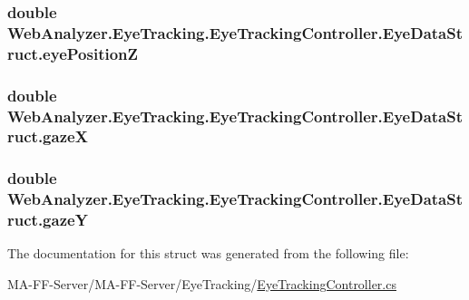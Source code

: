 \subsubsection[{eye\+Position\+Z}]{\setlength{\rightskip}{0pt plus 5cm}double Web\+Analyzer.\+Eye\+Tracking.\+Eye\+Tracking\+Controller.\+Eye\+Data\+Struct.\+eye\+Position\+Z}\label{struct_web_analyzer_1_1_eye_tracking_1_1_eye_tracking_controller_1_1_eye_data_struct_a6f66c9c36a4218d94bdd6fb4a4a033b6}
\hypertarget{struct_web_analyzer_1_1_eye_tracking_1_1_eye_tracking_controller_1_1_eye_data_struct_acaec5f71896bd916a0a3f1a49a1d9091}{}
\subsubsection[{gaze\+X}]{\setlength{\rightskip}{0pt plus 5cm}double Web\+Analyzer.\+Eye\+Tracking.\+Eye\+Tracking\+Controller.\+Eye\+Data\+Struct.\+gaze\+X}\label{struct_web_analyzer_1_1_eye_tracking_1_1_eye_tracking_controller_1_1_eye_data_struct_acaec5f71896bd916a0a3f1a49a1d9091}
\hypertarget{struct_web_analyzer_1_1_eye_tracking_1_1_eye_tracking_controller_1_1_eye_data_struct_af906fc37767cfe35becb556afb6242f6}{}
\subsubsection[{gaze\+Y}]{\setlength{\rightskip}{0pt plus 5cm}double Web\+Analyzer.\+Eye\+Tracking.\+Eye\+Tracking\+Controller.\+Eye\+Data\+Struct.\+gaze\+Y}\label{struct_web_analyzer_1_1_eye_tracking_1_1_eye_tracking_controller_1_1_eye_data_struct_af906fc37767cfe35becb556afb6242f6}


The documentation for this struct was generated from the following file\+:\begin{DoxyCompactItemize}
\item 
M\+A-\/\+F\+F-\/\+Server/\+M\+A-\/\+F\+F-\/\+Server/\+Eye\+Tracking/\hyperlink{_eye_tracking_controller_8cs}{Eye\+Tracking\+Controller.\+cs}\end{DoxyCompactItemize}
